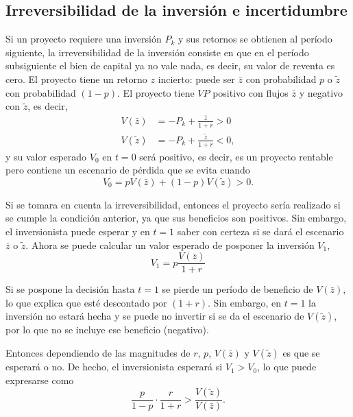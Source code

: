 \documentclass[DeGregorioResumen]{subfiles}
\begin{document}
\subsection{Irreversibilidad de la inversión e incertidumbre}

Si un proyecto requiere una inversión $P_k$ y sus retornos se obtienen al período siguiente, la irreversibilidad de la inversión consiste en que en el período subsiguiente el bien de capital ya no vale nada, es decir, su valor de reventa es cero. El proyecto tiene un retorno $z$ incierto: puede ser $\bar{z}$ con probabilidad $p$ o $\tilde{z}$ con probabilidad $(1-p)$. El proyecto tiene $VP$ positivo con flujos $\bar{z}$ y negativo con $\tilde{z}$, es decir,
\begin{align*}
V(\bar{z}) &= -P_k + \frac{\bar{z}}{1+r} > 0 \\
V(\tilde{z}) &= -P_k + \frac{\tilde{z}}{1+r} < 0,
\end{align*}
y su valor esperado $V_0$ en $t=0$ será positivo, es decir, es un proyecto rentable pero contiene un escenario de pérdida que se evita cuando
\begin{equation}
V_0 = pV(\bar{z})+(1-p)V(\tilde{z}) > 0.
\label{eq:V0_irrevers}
\end{equation}

Si se tomara en cuenta la irreversibilidad, entonces el proyecto sería realizado si se cumple la condición anterior, ya que sus beneficios son positivos. Sin embargo, el inversionista puede esperar y en $t=1$ saber con certeza si se dará el escenario $\bar{z}$ o $\tilde{z}$. Ahora se puede calcular un valor esperado de posponer la inversión $V_1$,
\begin{equation}
V_1 = p\frac{V(\bar{z})}{1+r}
\label{eq:V1_irrevers}
\end{equation}

Si se pospone la decisión hasta $t=1$ se pierde un período de beneficio de $V(\bar{z}) $, lo que explica que esté descontado por $(1+r)$. Sin embargo, en $t=1$ la inversión no estará hecha y se puede no invertir si se da el escenario de $V(\tilde{z})$, por lo que no se incluye ese beneficio (negativo).

Entonces dependiendo de las magnitudes de $r$, $p$, $V(\bar{z})$ y $V(\tilde{z})$ es que se esperará o no. De hecho, el inversionista esperará si $V_1>V_0$, lo que puede expresarse como
\begin{equation*}
\frac{p}{1-p} \cdot \frac{r}{1+r} > \frac{V(\tilde{z})}{V(\bar{z})}.
\end{equation*}
\end{document}
